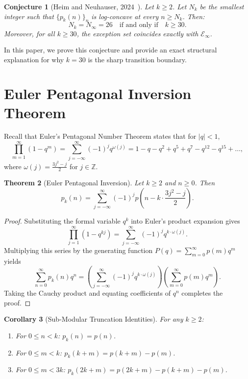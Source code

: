 \documentclass[11pt,reqno]{amsart}
\newtheorem{theorem}{Theorem}[section]
\newtheorem{corollary}[theorem]{Corollary}
\newtheorem{conjecture}[theorem]{Conjecture}
\theoremstyle{definition}
\numberwithin{equation}{section}
\begin{document}
\begin{conjecture}[Heim and Neuhauser, 2024~\cite{HeimNeuhauser2024}]
Let $k \ge 2$. Let $N_k$ be the smallest integer such that $\{p_k(n)\}_n$ is log-concave at every $n \ge N_k$. Then:
\[
N_k = N_\infty = 26 \quad \text{if and only if} \quad k \ge 30.
\]
Moreover, for all $k \ge 30$, the exception set coincides exactly with $\mathcal{E}_\infty$.
\end{conjecture}

In this paper, we prove this conjecture and provide an exact structural explanation for why $k = 30$ is the sharp transition boundary.

\section{Euler Pentagonal Inversion Theorem}

Recall that Euler's Pentagonal Number Theorem states that for $|q| < 1$,
\begin{equation}
\prod_{m=1}^\infty (1 - q^m) = \sum_{j=-\infty}^\infty (-1)^j q^{\omega(j)} = 1 - q - q^2 + q^5 + q^7 - q^{12} - q^{15} + \dots,
\end{equation}
where $\omega(j) = \frac{3j^2 - j}{2}$ for $j \in \mathbb{Z}$.

\begin{theorem}[Euler Pentagonal Inversion]\label{thm:inversion}
Let $k \ge 2$ and $n \ge 0$. Then
\begin{equation}
p_k(n) = \sum_{j=-\infty}^\infty (-1)^j p\left(n - k \cdot \frac{3j^2 - j}{2}\right).
\end{equation}
\end{theorem}

\begin{proof}
Substituting the formal variable $q^k$ into Euler's product expansion gives
\[
\prod_{j=1}^\infty (1 - q^{kj}) = \sum_{j=-\infty}^\infty (-1)^j q^{k \cdot \omega(j)}.
\]
Multiplying this series by the generating function $P(q) = \sum_{m=0}^\infty p(m) q^m$ yields
\[
\sum_{n=0}^\infty p_k(n) q^n = \left(\sum_{j=-\infty}^\infty (-1)^j q^{k \cdot \omega(j)}\right) \left(\sum_{m=0}^\infty p(m) q^m\right).
\]
Taking the Cauchy product and equating coefficients of $q^n$ completes the proof.
\end{proof}

\begin{corollary}[Sub-Modular Truncation Identities]\label{cor:truncation}
For any $k \ge 2$:
\begin{enumerate}
\item For $0 \le n < k$: $p_k(n) = p(n)$.
\item For $0 \le m < k$: $p_k(k+m) = p(k+m) - p(m)$.
\item For $0 \le m < 3k$: $p_k(2k+m) = p(2k+m) - p(k+m) - p(m)$.
\end{enumerate}
\end{corollary}
\end{document}
